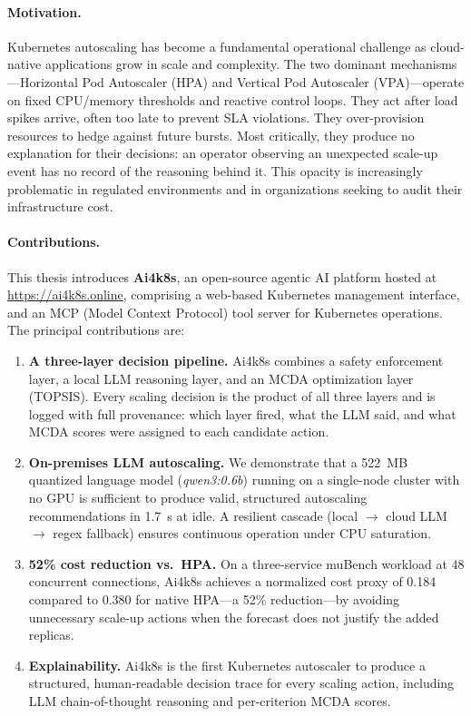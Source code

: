 
\paragraph{Motivation.}
Kubernetes autoscaling has become a fundamental operational challenge as cloud-native
applications grow in scale and complexity. The two dominant mechanisms—Horizontal
Pod Autoscaler (HPA) and Vertical Pod Autoscaler (VPA)—operate on fixed CPU/memory
thresholds and reactive control loops. They act after load spikes arrive, often too
late to prevent SLA violations. They over-provision resources to hedge against future
bursts. Most critically, they produce no explanation for their decisions: an operator
observing an unexpected scale-up event has no record of the reasoning behind it.
This opacity is increasingly problematic in regulated environments and in
organizations seeking to audit their infrastructure cost.

\paragraph{Contributions.}
This thesis introduces \textbf{Ai4k8s}, an open-source agentic AI platform hosted
at \url{https://ai4k8s.online}, comprising a web-based Kubernetes management interface,
and an MCP (Model Context Protocol) tool server for Kubernetes operations.
The principal contributions are:

\begin{enumerate}
  \item \textbf{A three-layer decision pipeline.} Ai4k8s combines a safety enforcement
  layer, a local LLM reasoning layer, and an MCDA optimization layer (TOPSIS). Every
  scaling decision is the product of all three layers and is logged with full provenance:
  which layer fired, what the LLM said, and what MCDA scores were assigned to each
  candidate action.

  \item \textbf{On-premises LLM autoscaling.} We demonstrate that a 522~MB
  quantized language model (\textit{qwen3:0.6b}) running on a single-node cluster
  with no GPU is sufficient to produce valid, structured autoscaling recommendations
  in 1.7~s at idle. A resilient cascade (local $\to$ cloud LLM $\to$ regex fallback)
  ensures continuous operation under CPU saturation.

  \item \textbf{52\% cost reduction vs.\ HPA.} On a three-service muBench workload
  at 48 concurrent connections, Ai4k8s achieves a normalized cost proxy of 0.184
  compared to 0.380 for native HPA—a 52\% reduction—by avoiding unnecessary
  scale-up actions when the forecast does not justify the added replicas.

  \item \textbf{Explainability.} Ai4k8s is the first Kubernetes autoscaler to
  produce a structured, human-readable decision trace for every scaling action,
  including LLM chain-of-thought reasoning and per-criterion MCDA scores.
\end{enumerate}

